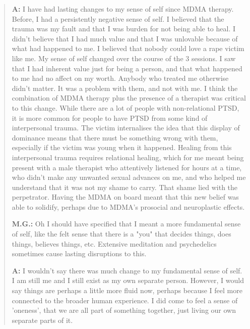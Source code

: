 \documentclass[12pt,letterpaper]{book}
\begin{document}
\begin{quotation}
    \textbf{A:} I have had lasting changes to my sense of self since MDMA therapy. Before, I had a persistently negative sense of self. I believed that the trauma was my fault and that I was burden for not being able to heal. I didn't believe that I had much value and that I was unlovable because of what had happened to me. I believed that nobody could love a rape victim like me. My sense of self changed over the course of the 3 sessions. I saw that I had inherent value just for being a person, and that what happened to me had no affect on my worth. Anybody who treated me otherwise didn't matter. It was a problem with them, and not with me. I think the combination of MDMA therapy plus the presence of a therapist was critical to this change. While there are a lot of people with non-relational PTSD, it is more common for people to have PTSD from some kind of interpersonal trauma. The victim internalises the idea that this display of dominance means that there must be something wrong with them, especially if the victim was young when it happened. Healing from this interpersonal trauma requires relational healing, which for me meant being present with a male therapist who attentively listened for hours at a time, who didn't make any unwanted sexual advances on me, and who helped me understand that it was not my shame to carry. That shame lied with the perpetrator. Having the MDMA on board meant that this new belief was able to solidify, perhaps due to MDMA's prosocial and neuroplastic effects.

    \vspace{\baselineskip}

    \textbf{M.G.:} Oh I should have specified that I meant a more fundamental sense of self, like the felt sense that there is a "you" that decides things, does things, believes things, etc. Extensive meditation and psychedelics sometimes cause lasting disruptions to this.

    \textbf{A:} I wouldn't say there was much change to my fundamental sense of self. I am still me and I still exist as my own separate person. However, I would say things are perhaps a little more fluid now, perhaps because I feel more connected to the broader human experience. I did come to feel a sense of 'oneness', that we are all part of something together, just living our own separate parts of it.
\end{quotation}
\end{document}
